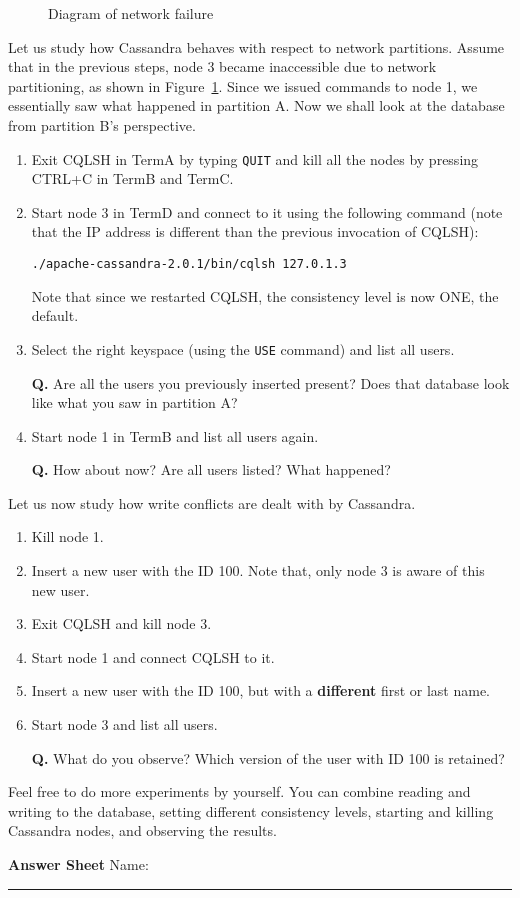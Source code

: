 \documentclass[a4paper,12pt]{article}
\newcommand\code[1]{\texttt{#1}}
\newcounter{question}
\newcommand{\question}{%
	\stepcounter{question}%
	\textbf{Q\thequestion. }}
\begin{document}
\begin{figure}[!t]
\centering
\scalebox{0.8}{
}
\caption{Diagram of network failure}
\label{fig:partitions}
\end{figure}

Let us study how Cassandra behaves with respect to network partitions. Assume that in the previous steps, node 3 became inaccessible due to network partitioning, as shown in Figure~\ref{fig:partitions}. Since we issued commands to node 1, we essentially saw what happened in partition A. Now we shall look at the database from partition B's perspective.

\begin{enumerate}
	\item Exit CQLSH in TermA by typing \code{QUIT} and kill all the nodes by pressing CTRL+C in TermB and TermC.
	\item Start node 3 in TermD and connect to it using the following command (note that the IP address is different than the previous invocation of CQLSH):
\begin{lstlisting}
./apache-cassandra-2.0.1/bin/cqlsh 127.0.1.3
\end{lstlisting}
	Note that since we restarted CQLSH, the consistency level is now ONE, the default.

	\item Select the right keyspace (using the \code{USE} command) and list all users.
	
	\question Are all the users you previously inserted present? Does that database look like what you saw in partition A?

	\item Start node 1 in TermB and list all users again.
	
	\question How about now? Are all users listed? What happened?	

\end{enumerate}

Let us now study how write conflicts are dealt with by Cassandra.

\begin{enumerate}
	\item Kill node 1.

	\item Insert a new user with the ID 100. Note that, only node 3 is aware of this new user.

	\item Exit CQLSH and kill node 3.

	\item Start node 1 and connect CQLSH to it.
	 
	\item Insert a new user with the ID 100, but with a \textbf{different} first or last name.

	\item Start node 3 and list all users.

	\question What do you observe? Which version of the user with ID 100 is retained?
\end{enumerate}

Feel free to do more experiments by yourself. You can combine reading and writing to the database, setting different consistency levels, starting and killing Cassandra nodes, and observing the results.

\clearpage
{\bf\large Answer Sheet} \hfill Name: \rule{10em}{0.1mm}
\end{document}
